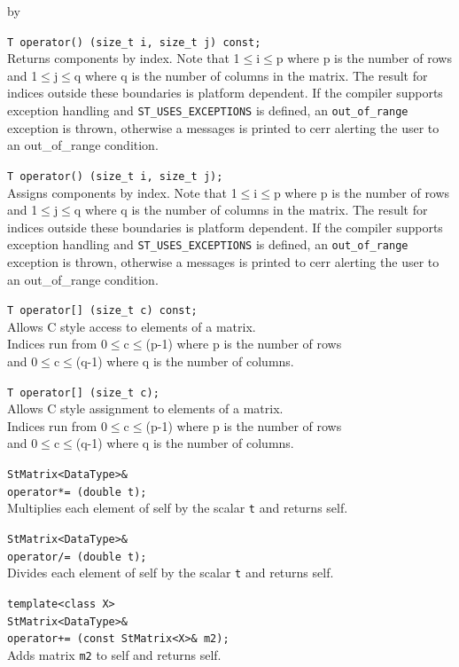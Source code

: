 \documentclass[twoside]{article}
\newcommand{\comp}[1]{\texttt{#1}}%
\newcommand{\entrylabel}[1]{\mbox{\textbf{{#1}}}\hfil}%
\newenvironment{entry}
{\begin{list}{}%
    {\renewcommand{\makelabel}{\entrylabel}%
     \setlength{\labelwidth}{90pt}%
     \setlength{\leftmargin}{\labelwidth}
     \advance\leftmargin by \labelsep%
      }%
    }%
  {\end{list}}
\newcommand{\Entrylabel}[1]%
{\raisebox{0pt}[1ex][0pt]{\makebox[\labelwidth][l]%
    {\parbox[t]{\labelwidth}{\hspace{0pt}\textbf{{#1}}}}}}
\newenvironment{Entry}%
{\renewcommand{\entrylabel}{\Entrylabel}\begin{entry}}%
  {\end{entry}}
\begin{document}
\begin{description}
\begin{Entry}
    \verb+T operator() (size_t i, size_t j) const;+\\
    Returns components by index. Note that 1$\leq$i$\leq$p where p
    is the number of rows and 1$\leq$j$\leq$q where q is
    the number of columns in the matrix.  The result for
    indices outside these boundaries is platform
    dependent. If the compiler supports exception handling and
    \comp{ST\_USES\_EXCEPTIONS} is defined, an 
    \comp{out\_of\_range} exception is thrown, otherwise a
    messages is printed to cerr alerting the user to an out\_of\_range
    condition.

    \verb+T operator() (size_t i, size_t j);+\\
    Assigns components by index. Note that 1$\leq$i$\leq$p where p
    is the number of rows and 1$\leq$j$\leq$q where q is
    the number of columns in the matrix.  The result for
    indices outside these boundaries is platform
    dependent. If the compiler supports exception handling and
    \comp{ST\_USES\_EXCEPTIONS} is defined, an
    \comp{out\_of\_range} exception is thrown, otherwise a
    messages is printed to cerr alerting the user to an out\_of\_range
    condition.
    
    \verb+T operator[] (size_t c) const;+\\
    Allows C style access to elements of a matrix. \\
    Indices run from  0$\leq$c$\leq$(p-1) where p is the
    number of rows \\
    and 0$\leq$c$\leq$(q-1) where q is the number of columns.

    \verb+T operator[] (size_t c);+\\
    Allows C style assignment to elements of a matrix. \\
    Indices run from  0$\leq$c$\leq$(p-1) where p is the
    number of rows \\
    and 0$\leq$c$\leq$(q-1) where q is the number of columns.
    
    \verb+StMatrix<DataType>&+\\
    \verb+operator*= (double t);+\\
    Multiplies each element of self by the scalar \comp{t}
    and returns self.
    
    \verb+StMatrix<DataType>&+\\
    \verb+operator/= (double t);+\\
    Divides each element of self by the scalar \comp{t}
    and returns self.
    
    \verb+template<class X>+\\
    \verb+StMatrix<DataType>&+\\
    \verb#operator+= (const StMatrix<X>& m2);#\\
    Adds matrix \comp{m2} to self and returns self.
    

\end{Entry}
\end{description}
\end{document}
